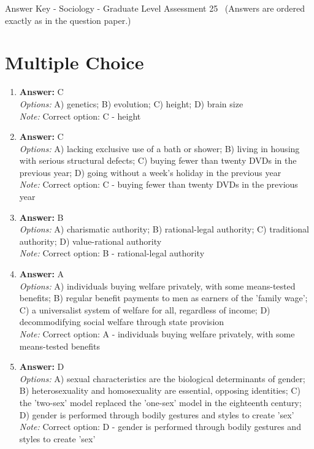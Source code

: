 \documentclass[12pt]{article}
\begin{document}
\begin{center}
Answer Key - Sociology - Graduate Level Assessment 25 \
\small (Answers are ordered exactly as in the question paper.)
\end{center}

\section*{Multiple Choice}
\begin{enumerate}[label=\arabic*.]
\item \textbf{Answer:} C
\\ \textit{Options:} A) genetics; B) evolution; C) height; D) brain size
\\ \textit{Note:} Correct option: C - height
\item \textbf{Answer:} C
\\ \textit{Options:} A) lacking exclusive use of a bath or shower; B) living in housing with serious structural defects; C) buying fewer than twenty DVDs in the previous year; D) going without a week's holiday in the previous year
\\ \textit{Note:} Correct option: C - buying fewer than twenty DVDs in the previous year
\item \textbf{Answer:} B
\\ \textit{Options:} A) charismatic authority; B) rational-legal authority; C) traditional authority; D) value-rational authority
\\ \textit{Note:} Correct option: B - rational-legal authority
\item \textbf{Answer:} A
\\ \textit{Options:} A) individuals buying welfare privately, with some means-tested benefits; B) regular benefit payments to men as earners of the 'family wage'; C) a universalist system of welfare for all, regardless of income; D) decommodifying social welfare through state provision
\\ \textit{Note:} Correct option: A - individuals buying welfare privately, with some means-tested benefits
\item \textbf{Answer:} D
\\ \textit{Options:} A) sexual characteristics are the biological determinants of gender; B) heterosexuality and homosexuality are essential, opposing identities; C) the 'two-sex' model replaced the 'one-sex' model in the eighteenth century; D) gender is performed through bodily gestures and styles to create 'sex'
\\ \textit{Note:} Correct option: D - gender is performed through bodily gestures and styles to create 'sex'
\end{enumerate}
\end{document}
